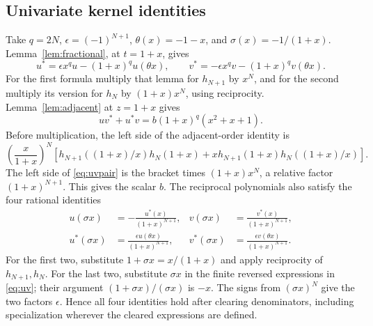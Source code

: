 \documentclass[11pt,a4paper]{amsart}
\theoremstyle{remark}\newtheorem{remark}[theorem]{Remark}
\numberwithin{equation}{section}
\begin{document}
\subsection{Univariate kernel identities}
Take $q=2N$, $\epsilon=(-1)^{N+1}$, $\theta(x)=-1-x$, and $\sigma(x)=-1/(1+x)$. Lemma~\ref{lem:fractional}, at $t=1+x$, gives
\begin{equation}\label{eq:theta}
 u^*=\epsilon x^qu-(1+x)^qu(\theta x),\qquad
 v^*=-\epsilon x^qv-(1+x)^qv(\theta x).
\end{equation}
For the first formula multiply that lemma for $h_{N+1}$ by $x^N$, and for the second multiply its version for $h_N$ by $(1+x)x^N$, using reciprocity. Lemma~\ref{lem:adjacent} at $z=1+x$ gives
\begin{equation}\label{eq:uvpair}
 uv^*+u^*v=b(1+x)^q(x^2+x+1).
\end{equation}
Before multiplication, the left side of the adjacent-order identity is
\[
 \left(\frac{x}{1+x}\right)^N
 \left[h_{N+1}((1+x)/x)h_N(1+x)
 +xh_{N+1}(1+x)h_N((1+x)/x)\right].
\]
The left side of \eqref{eq:uvpair} is the bracket times $(1+x)x^N$, a relative factor $(1+x)^{N+1}$. This gives the scalar $b$.
The reciprocal polynomials also satisfy the four rational identities
\begin{equation}\label{eq:sigma}
 \begin{aligned}
 u(\sigma x)&=-\frac{u^*(x)}{(1+x)^{N+1}},&
 v(\sigma x)&=\frac{v^*(x)}{(1+x)^{N+1}},\\
 u^*(\sigma x)&=\frac{\epsilon u(\theta x)}{(1+x)^{N+1}},&
 v^*(\sigma x)&=\frac{\epsilon v(\theta x)}{(1+x)^{N+1}}.
 \end{aligned}
\end{equation}
For the first two, substitute $1+\sigma x=x/(1+x)$ and apply reciprocity of $h_{N+1},h_N$. For the last two, substitute $\sigma x$ in the finite reversed expressions in \eqref{eq:uv}; their argument $(1+\sigma x)/(\sigma x)$ is $-x$. The signs from $(\sigma x)^N$ give the two factors $\epsilon$. Hence all four identities hold after clearing denominators, including specialization wherever the cleared expressions are defined.
\end{document}
